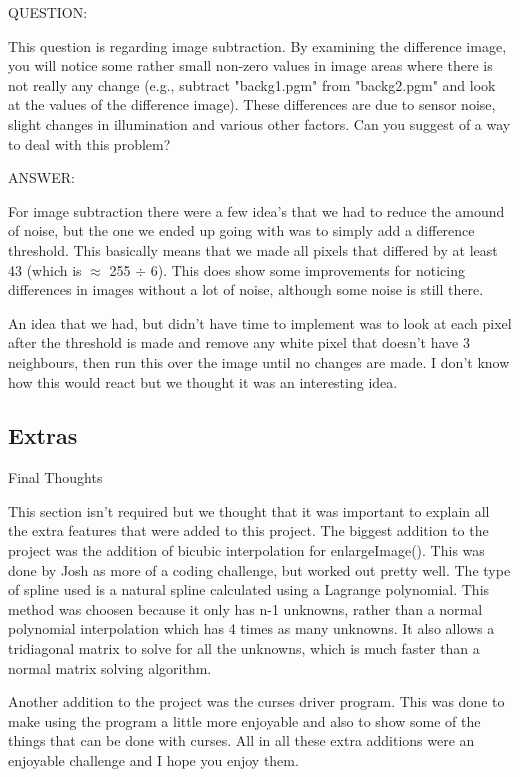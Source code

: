 \documentclass[pdftex, 11pt]{article}
\begin{document}
		\begin{description}

			\item{QUESTION:}
			
				This question is regarding image subtraction. By examining the difference image,
				you will notice some rather small non-zero values in image areas where there is not really any
				change (e.g., subtract "backg1.pgm" from "backg2.pgm" and look at the values of the difference
				image). These differences are due to sensor noise, slight changes in illumination and various
				other factors. Can you suggest of a way to deal with this problem?

			\item{ANSWER:}

				For image subtraction there were a few idea's that we had to reduce the amound of noise, but the
				one we ended up going with was to simply add a difference threshold.  This basically means that
				we made all pixels that differed by at least 43 (which is $\approx$ 255 $\div$ 6).  This does
				show some improvements for noticing differences in images without a lot of noise, although some
				noise is still there.

				An idea that we had, but didn't have time to implement was to look at each pixel after the threshold
				is made and remove any white pixel that doesn't have 3 neighbours, then run this over the image until
				no changes are made.  I don't know how this would react but we thought it was an interesting idea.

		\end{description}
	
	\subsection{Extras}

		\begin{description}

			\item{Final Thoughts}

				This section isn't required but we thought that it was important to explain all the extra features that
				were added to this project.  The biggest addition to the project was the addition of bicubic interpolation
				for enlargeImage().  This was done by Josh as more of a coding challenge, but worked out pretty well.  The
				type of spline used is a natural spline calculated using a Lagrange polynomial.  This method was choosen
				because it only has n-1 unknowns, rather than a normal polynomial interpolation which has 4 times as many
				unknowns.  It also allows a tridiagonal matrix to solve for all the unknowns, which is much faster than
				a normal matrix solving algorithm.

				Another addition to the project was the curses driver program.  This was done to make using the program a
				little more enjoyable and also to show some of the things that can be done with curses.  All in all these
				extra additions were an enjoyable challenge and I hope you enjoy them.

		\end{description}
\end{document}
